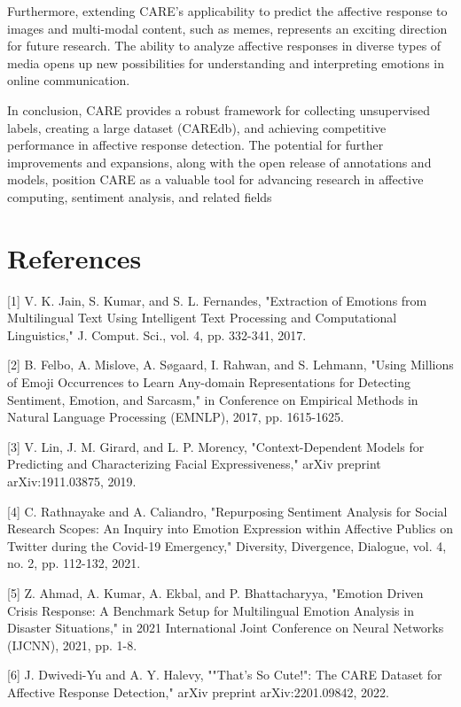 \documentclass[conference]{IEEEtran}
\begin{document}
Furthermore, extending CARE's applicability to predict the affective response to images and multi-modal content, such as memes, represents an exciting direction for future research. The ability to analyze affective responses in diverse types of media opens up new possibilities for understanding and interpreting emotions in online communication.

In conclusion, CARE provides a robust framework for collecting unsupervised labels, creating a large dataset (CAREdb), and achieving competitive performance in affective response detection. The potential for further improvements and expansions, along with the open release of annotations and models, position CARE as a valuable tool for advancing research in affective computing, sentiment analysis, and related fields


\section*{References}

[1] V. K. Jain, S. Kumar, and S. L. Fernandes, "Extraction of Emotions from Multilingual Text Using Intelligent Text Processing and Computational Linguistics," J. Comput. Sci., vol. 4, pp. 332-341, 2017.

[2] B. Felbo, A. Mislove, A. Søgaard, I. Rahwan, and S. Lehmann, "Using Millions of Emoji Occurrences to Learn Any-domain Representations for Detecting Sentiment, Emotion, and Sarcasm," in Conference on Empirical Methods in Natural Language Processing (EMNLP), 2017, pp. 1615-1625.

[3] V. Lin, J. M. Girard, and L. P. Morency, "Context-Dependent Models for Predicting and Characterizing Facial Expressiveness," arXiv preprint arXiv:1911.03875, 2019.

[4] C. Rathnayake and A. Caliandro, "Repurposing Sentiment Analysis for Social Research Scopes: An Inquiry into Emotion Expression within Affective Publics on Twitter during the Covid-19 Emergency," Diversity, Divergence, Dialogue, vol. 4, no. 2, pp. 112-132, 2021.

[5] Z. Ahmad, A. Kumar, A. Ekbal, and P. Bhattacharyya, "Emotion Driven Crisis Response: A Benchmark Setup for Multilingual Emotion Analysis in Disaster Situations," in 2021 International Joint Conference on Neural Networks (IJCNN), 2021, pp. 1-8.

[6] J. Dwivedi-Yu and A. Y. Halevy, ""That's So Cute!": The CARE Dataset for Affective Response Detection," arXiv preprint arXiv:2201.09842, 2022.
\end{document}
